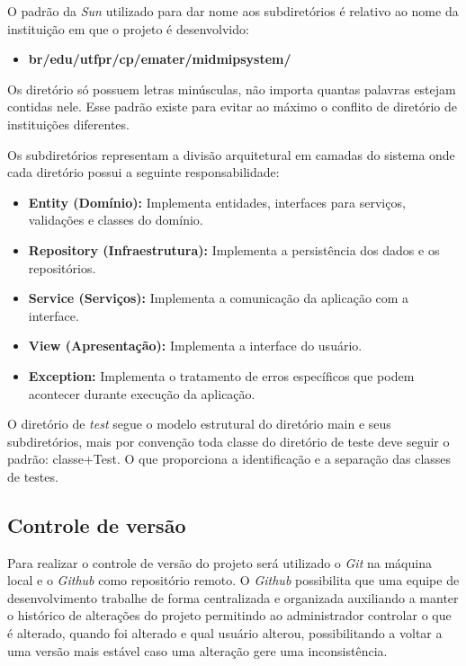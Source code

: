 O padrão da \textit{Sun} utilizado para dar nome aos subdiretórios é relativo ao nome da instituição em que o projeto é desenvolvido:

\begin{itemize}
 
\item \textbf{br/edu/utfpr/cp/emater/midmipsystem/}
\end{itemize}


Os diretório só possuem letras minúsculas, não importa quantas palavras estejam contidas nele. Esse padrão existe para evitar ao máximo o conflito de diretório de instituições diferentes.

Os subdiretórios representam a divisão arquitetural em camadas do sistema onde cada diretório possui a seguinte responsabilidade: 

\begin{itemize}
 

\item \textbf{Entity (Domínio):} Implementa entidades, interfaces para serviços, validações e classes do domínio. 


\item \textbf{Repository (Infraestrutura):} Implementa a persistência dos dados e os repositórios.

\item \textbf{Service (Serviços):} Implementa a comunicação da aplicação com a interface.

\item \textbf{View (Apresentação):} Implementa a interface do usuário.

\item \textbf{Exception:} Implementa o tratamento de erros específicos que podem acontecer durante execução da aplicação.
\end{itemize}

O diretório de \textit{test} segue o modelo estrutural do diretório main e seus subdiretórios, mais por convenção toda classe do diretório de teste deve seguir o padrão: classe+Test. O que proporciona a identificação e a separação das classes de testes.  

\subsection{Controle de versão}

Para realizar o controle de versão do projeto será utilizado o \textit{Git} na máquina local e o \textit{Github} como repositório remoto. O \textit{Github} possibilita que uma equipe de desenvolvimento trabalhe de forma centralizada e organizada auxiliando a manter o histórico de alterações do projeto permitindo ao administrador controlar o que é alterado, quando foi alterado e qual usuário alterou, possibilitando a voltar a uma versão mais estável caso uma alteração gere uma inconsistência.

